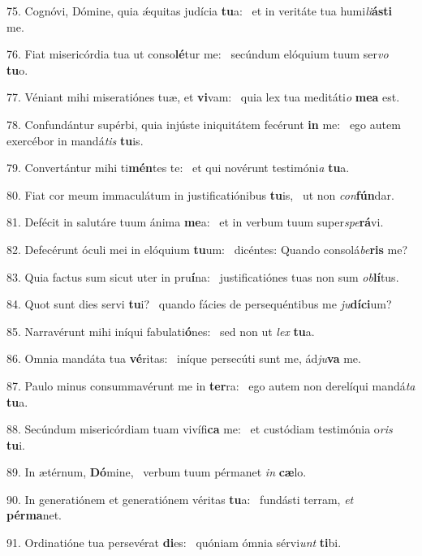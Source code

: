 75. Cognóvi, Dómine, quia ǽquitas judícia \textbf{tu}a: \ast\  et in veritáte tua humi\textit{li}\textbf{ás}\textbf{ti} me.\

76. Fiat misericórdia tua ut conso\textbf{lé}tur me: \ast\  secúndum elóquium tuum ser\textit{vo} \textbf{tu}o.\

77. Véniant mihi miseratiónes tuæ, et \textbf{vi}vam: \ast\  quia lex tua meditáti\textit{o} \textbf{me}\textbf{a} est.\

78. Confundántur supérbi, quia injúste iniquitátem fecérunt \textbf{in} me: \ast\  ego autem exercébor in mandá\textit{tis} \textbf{tu}is.\

79. Convertántur mihi ti\textbf{mén}tes te: \ast\  et qui novérunt testimóni\textit{a} \textbf{tu}a.\

80. Fiat cor meum immaculátum in justificatiónibus \textbf{tu}is, \ast\  ut non \textit{con}\textbf{fún}dar.\

81. Defécit in salutáre tuum ánima \textbf{me}a: \ast\  et in verbum tuum super\textit{spe}\textbf{rá}vi.\

82. Defecérunt óculi mei in elóquium \textbf{tu}um: \ast\  dicéntes: Quando consolá\textit{be}\textbf{ris} me?\

83. Quia factus sum sicut uter in pru\textbf{í}na: \ast\  justificatiónes tuas non sum \textit{ob}\textbf{lí}tus.\

84. Quot sunt dies servi \textbf{tu}i? \ast\  quando fácies de persequéntibus me \textit{ju}\textbf{dí}\textbf{ci}um?\

85. Narravérunt mihi iníqui fabulati\textbf{ó}nes: \ast\  sed non ut \textit{lex} \textbf{tu}a.\

86. Omnia mandáta tua \textbf{vé}ritas: \ast\  iníque persecúti sunt me, ád\textit{ju}\textbf{va} me.\

87. Paulo minus consummavérunt me in \textbf{ter}ra: \ast\  ego autem non derelíqui mandá\textit{ta} \textbf{tu}a.\

88. Secúndum misericórdiam tuam vivífi\textbf{ca} me: \ast\  et custódiam testimónia o\textit{ris} \textbf{tu}i.\

89. In ætérnum, \textbf{Dó}mine, \ast\  verbum tuum pérmanet \textit{in} \textbf{cæ}lo.\

90. In generatiónem et generatiónem véritas \textbf{tu}a: \ast\  fundásti terram, \textit{et} \textbf{pér}\textbf{ma}net.\

91. Ordinatióne tua persevérat \textbf{di}es: \ast\  quóniam ómnia sérvi\textit{unt} \textbf{ti}bi.\

